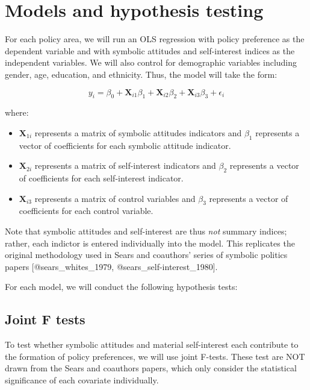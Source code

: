 \documentclass[]{article}
\begin{document}
\section{Models and hypothesis
testing}\label{models-and-hypothesis-testing}

For each policy area, we will run an OLS regression with policy
preference as the dependent variable and with symbolic attitudes and
self-interest indices as the independent variables. We will also control
for demographic variables including gender, age, education, and
ethnicity. Thus, the model will take the form:

\[y_i = \beta_0 + \textbf{X}_{i1}\beta_1 + \textbf{X}_{i2}\beta_2 +  \textbf{X}_{i3}\beta_3 + \epsilon_i \]

where:

\begin{itemize}
  \item $\textbf{X}_{1i}$ represents a matrix of symbolic attitudes indicators and $\beta_1$ represents a vector of coefficients for each symbolic attitude indicator.
  \item $\textbf{X}_{2i}$ represents a matrix of self-interest indicators and $\beta_2$ represents a vector of coefficients for each self-interest indicator.
  \item $\textbf{X}_{i3}$ represents a matrix of control variables and $\beta_3$ represents a vector of coefficients for each control variable.
\end{itemize}

Note that symbolic attitudes and self-interest are thus \emph{not}
summary indices; rather, each indictor is entered individually into the
model. This replicates the original methodology used in Sears and
coauthors' series of symbolic politics papers {[}@sears\_whites\_1979,
@sears\_self-interest\_1980{]}.

For each model, we will conduct the following hypothesis tests:

\subsection{Joint F tests}\label{joint-f-tests}

To test whether symbolic attitudes and material self-interest each
contribute to the formation of policy preferences, we will use joint
F-tests. These test are NOT drawn from the Sears and coauthors papers,
which only consider the statistical significance of each covariate
individually.
\end{document}
